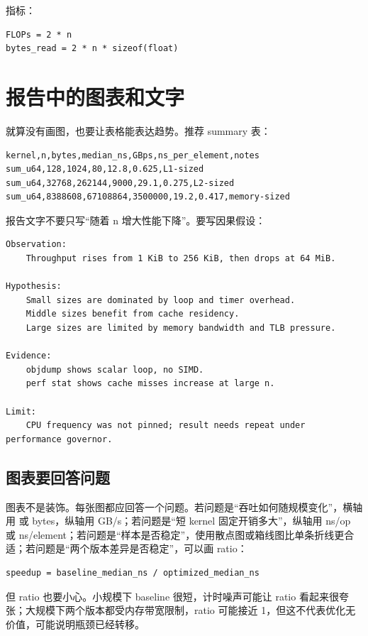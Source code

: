 指标：

\begin{lstlisting}
FLOPs = 2 * n
bytes_read = 2 * n * sizeof(float)
\end{lstlisting}

\section{报告中的图表和文字}

就算没有画图，也要让表格能表达趋势。推荐 summary 表：

\begin{lstlisting}
kernel,n,bytes,median_ns,GBps,ns_per_element,notes
sum_u64,128,1024,80,12.8,0.625,L1-sized
sum_u64,32768,262144,9000,29.1,0.275,L2-sized
sum_u64,8388608,67108864,3500000,19.2,0.417,memory-sized
\end{lstlisting}

报告文字不要只写“随着 n 增大性能下降”。要写因果假设：

\begin{lstlisting}
Observation:
    Throughput rises from 1 KiB to 256 KiB, then drops at 64 MiB.

Hypothesis:
    Small sizes are dominated by loop and timer overhead.
    Middle sizes benefit from cache residency.
    Large sizes are limited by memory bandwidth and TLB pressure.

Evidence:
    objdump shows scalar loop, no SIMD.
    perf stat shows cache misses increase at large n.

Limit:
    CPU frequency was not pinned; result needs repeat under performance governor.
\end{lstlisting}

\subsection{图表要回答问题}

图表不是装饰。每张图都应回答一个问题。若问题是“吞吐如何随规模变化”，横轴用  或 bytes，纵轴用 GB/s；若问题是“短 kernel 固定开销多大”，纵轴用 ns/op 或 ns/element；若问题是“样本是否稳定”，使用散点图或箱线图比单条折线更合适；若问题是“两个版本差异是否稳定”，可以画 ratio：

\begin{lstlisting}
speedup = baseline_median_ns / optimized_median_ns
\end{lstlisting}

但 ratio 也要小心。小规模下 baseline 很短，计时噪声可能让 ratio 看起来很夸张；大规模下两个版本都受内存带宽限制，ratio 可能接近 1，但这不代表优化无价值，可能说明瓶颈已经转移。

